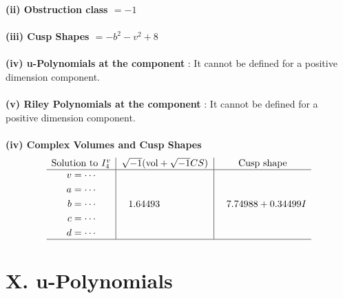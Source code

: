 \documentclass[1p]{elsarticle_modified}
\theoremstyle{definition}
\newcommand{\I}{\sqrt{-1}}
\begin{document}
\flushleft \textbf{(ii) Obstruction class $= -1$}\\~\\
\flushleft \textbf{(iii) Cusp Shapes $= - b^2- v^2+8$}\\~\\
\flushleft \textbf{(iv) u-Polynomials at the component} : It cannot be defined for a positive dimension component.\\~\\
\flushleft \textbf{(v) Riley Polynomials at the component} : It cannot be defined for a positive dimension component.\\~\\
\newpage\flushleft \textbf{(iv) Complex Volumes and Cusp Shapes}
$$\begin{array}{c|c|c} 
\text{Solution to }I^v_{4}& \I (\text{vol} + \sqrt{-1}CS) & \text{Cusp shape}\\
 \hline 
\begin{aligned}
v &= \cdots \\
a &= \cdots \\
b &= \cdots \\
c &= \cdots \\
d &= \cdots\end{aligned}
 & \phantom{-}1.64493\phantom{ +0.000000I} & \phantom{-}7.74988 + 0.34499 I\\
 \hline 
 \end{array}
$$
\newpage\renewcommand{\arraystretch}{1}
\centering \section*{ X. u-Polynomials}
\end{document}
